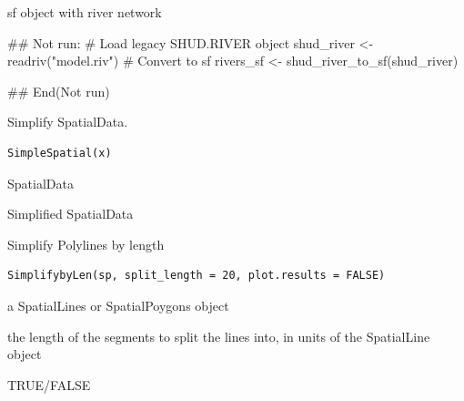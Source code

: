 \documentclass[a4paper]{book}
\begin{document}
%
\begin{Value}
sf object with river network
\end{Value}
%
\begin{Examples}
\begin{ExampleCode}
## Not run: 
# Load legacy SHUD.RIVER object
shud_river <- readriv("model.riv")
# Convert to sf
rivers_sf <- shud_river_to_sf(shud_river)

## End(Not run)
\end{ExampleCode}
\end{Examples}
%
\begin{Description}\relax
Simplify SpatialData.
\end{Description}
%
\begin{Usage}
\begin{verbatim}
SimpleSpatial(x)
\end{verbatim}
\end{Usage}
%
\begin{Arguments}
\begin{ldescription}
\item[\code{x}] SpatialData
\end{ldescription}
\end{Arguments}
%
\begin{Value}
Simplified SpatialData
\end{Value}
%
\begin{Description}\relax
Simplify Polylines by length
\end{Description}
%
\begin{Usage}
\begin{verbatim}
SimplifybyLen(sp, split_length = 20, plot.results = FALSE)
\end{verbatim}
\end{Usage}
%
\begin{Arguments}
\begin{ldescription}
\item[\code{sp}] a SpatialLines or SpatialPoygons object

\item[\code{split\_length}] the length of the segments to split the lines into, in units of the SpatialLine object

\item[\code{plot.results}] TRUE/FALSE
\end{ldescription}
\end{Arguments}
\end{document}
